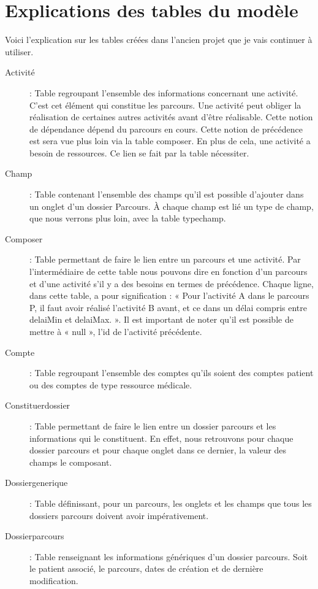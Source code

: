 \documentclass{polytech/polytech}
\begin{document}
\chapter{Explications des tables du modèle}
\label{ann:expModele}


Voici l'explication sur les tables créées dans l'ancien projet que je vais continuer à utiliser.

\begin{description}
	\item[Activité] : Table regroupant l'ensemble des informations concernant une activité. C'est cet élément qui constitue les parcours. Une activité peut obliger la réalisation de certaines autres activités avant d'être réalisable. Cette notion de dépendance dépend du parcours en cours. Cette notion de précédence est sera vue plus loin via la table composer. En plus de cela, une activité a besoin de ressources. Ce lien se fait par la table nécessiter.
	\item[Champ] : Table contenant l'ensemble des champs qu'il est possible d'ajouter dans un onglet d'un dossier Parcours. À chaque champ est lié un type de champ, que nous verrons plus loin, avec la table typechamp.
	\item[Composer] : Table permettant de faire le lien entre un parcours et une activité. Par l'intermédiaire de cette table nous pouvons dire en fonction d'un parcours et d'une activité s'il y a des besoins en termes de précédence. Chaque ligne, dans cette table, a pour signification : « Pour l'activité A dans le parcours P, il faut avoir réalisé l'activité B avant, et ce dans un délai compris entre delaiMin et delaiMax. ». Il est important de noter qu'il est possible de mettre à « null », l'id de l'activité précédente.
	\item[Compte] : Table regroupant l'ensemble des comptes qu'ils soient des comptes patient ou des comptes de type ressource médicale.
	\item[Constituerdossier] : Table permettant de faire le lien entre un dossier parcours et les informations qui le constituent. En effet, nous retrouvons pour chaque dossier parcours et pour chaque onglet dans ce dernier, la valeur des champs le composant.
	\item[Dossiergenerique] : Table définissant, pour un parcours, les onglets et les champs que tous les dossiers parcours doivent avoir impérativement.
	\item[Dossierparcours] : Table renseignant les informations génériques d'un dossier parcours. Soit le patient associé, le parcours, dates de création et de dernière modification.

\end{description}
\end{document}

